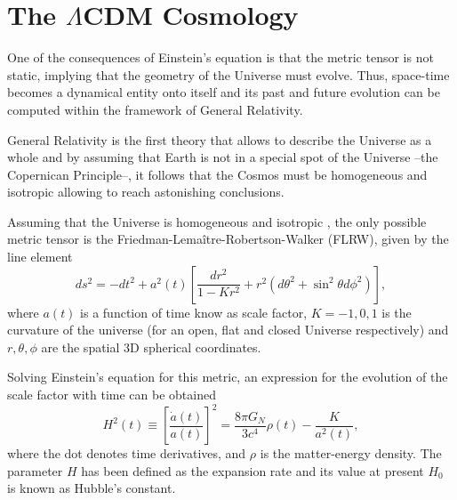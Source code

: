 \section{The $\Lambda$CDM Cosmology}
One of the consequences of Einstein's equation is that the metric tensor is not static, implying that the geometry of the Universe must evolve. Thus, space-time becomes a dynamical entity onto itself and its past and future evolution can be computed within the framework of General Relativity.
\newline

General Relativity is the first theory that allows to describe the Universe as a whole and by assuming that Earth is not in a special spot of the Universe --the Copernican Principle--, it follows that the Cosmos must be homogeneous and isotropic allowing to reach astonishing conclusions.
\newline

Assuming that the Universe is homogeneous and isotropic \citep{2014MNRAS.440...10A,2015MNRAS.449..670A}, the only possible metric tensor is the Friedman-Lema\^itre-Robertson-Walker (FLRW), given by the line element \cite{1927ASSB...47...49L}
\begin{equation}
ds^2 = -dt^2+a^2(t)\left[\frac{dr^2}{1-Kr^2}+r^2(d\theta^2+\sin^2\theta d\phi^2)\right],
\end{equation}
where $a(t)$ is a function of time know as scale factor, $K=-1,0,1$ is the curvature of the universe (for an open, flat and closed Universe respectively) and $r,\theta,\phi$ are the spatial 3D spherical coordinates.
\newline

Solving Einstein's equation for this metric, an expression for the evolution of the scale factor with time can be obtained
\begin{equation}
H^2(t)\equiv \left[\frac{\dot a(t)}{a(t)}\right]^2 = \frac{8\pi G_N}{3c^4}\rho(t) -\frac{K}{a^2(t)},
\end{equation}
where the dot denotes time derivatives, and $\rho$ is the matter-energy density. The parameter $H$ has been defined as the expansion rate and its value at present $H_0$ is known as Hubble's constant.
\newline

